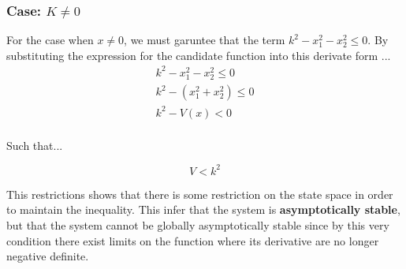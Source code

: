 \subsubsection*{Case: $K \neq 0$}

\noindent For the case when $x \neq 0 $, we must garuntee that the term $k^2 - x_1^2 -x_2^2 \leq 0 $. By substituting the expression for the candidate function into this derivate form ...
\begin{equation}
\begin{array}{l}
  k^2 - x_1^2 -x_2^2 \leq 0 \\
 k^2 - (x_1^2 +x_2^2) \leq 0 \\
 k^2 - V(x) < 0 \\
\end{array}
\end{equation}

\noindent Such that...

$$
V < k^2
$$

\noindent This restrictions shows that there is some restriction on the state space in order to maintain the inequality. This infer that the system is \textbf{asymptotically stable}, but that the system cannot be globally asymptotically stable since by this very condition there exist limits on the function where its derivative are no longer negative definite.
